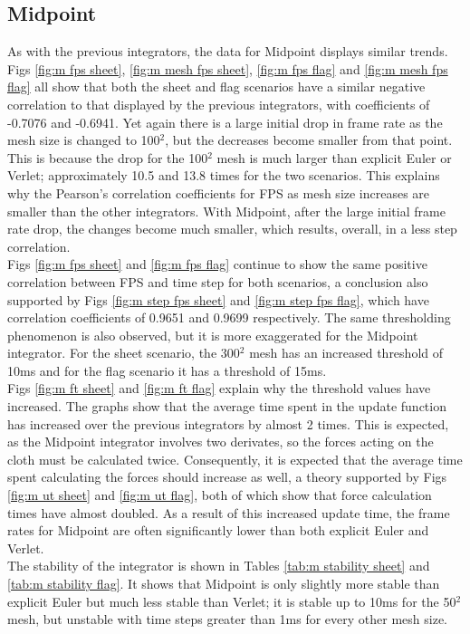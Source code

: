 \subsection{Midpoint}
As with the previous integrators, the data for Midpoint displays similar trends.
\\Figs \ref{fig:m fps sheet}, \ref{fig:m mesh fps sheet}, \ref{fig:m fps flag} and \ref{fig:m mesh fps flag} all show that both the sheet and flag scenarios have a similar negative correlation to that displayed by the previous integrators, with coefficients of -0.7076 and -0.6941. Yet again there is a large initial drop in frame rate as the mesh size is changed to 100$^{2}$, but the decreases become smaller from that point. This is because the drop for the 100$^{2}$ mesh is much larger than explicit Euler or Verlet; approximately 10.5 and 13.8 times for the two scenarios. This explains why the Pearson's correlation coefficients for FPS as mesh size increases are smaller than the other integrators. With Midpoint, after the large initial frame rate drop, the changes become much smaller, which results, overall, in a less step correlation.
\\Figs \ref{fig:m fps sheet} and \ref{fig:m fps flag} continue to show the same positive correlation between FPS and time step for both scenarios, a conclusion also supported by Figs \ref{fig:m step fps sheet} and \ref{fig:m step fps flag}, which have correlation coefficients of 0.9651 and 0.9699 respectively. The same thresholding phenomenon is also observed, but it is more exaggerated for the Midpoint integrator. For the sheet scenario, the 300$^{2}$ mesh has an increased threshold of 10ms and for the flag scenario it has a threshold of 15ms.
\\Figs \ref{fig:m ft sheet} and \ref{fig:m ft flag} explain why the threshold values have increased. The graphs show that the average time spent in the update function has increased over the previous integrators by almost 2 times. This is expected, as the Midpoint integrator involves two derivates, so the forces acting on the cloth must be calculated twice. Consequently, it is expected that the average time spent calculating the forces should increase as well, a theory supported by Figs \ref{fig:m ut sheet} and \ref{fig:m ut flag}, both of which show that force calculation times have almost doubled. As a result of this increased update time, the frame rates for Midpoint are often significantly lower than both explicit Euler and Verlet.
\\The stability of the integrator is shown in Tables \ref{tab:m stability sheet} and \ref{tab:m stability flag}. It shows that Midpoint is only slightly more stable than explicit Euler but much less stable than Verlet; it is stable up to 10ms for the 50$^{2}$ mesh, but unstable with time steps greater than 1ms for every other mesh size.

